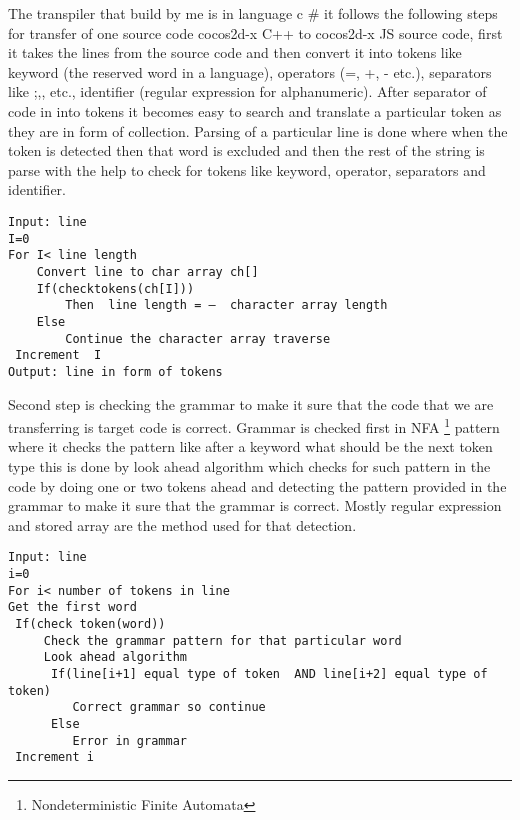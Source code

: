 \documentclass[23pt]{article}
\begin{document}
{\Large The transpiler that build by me is in language c \# it follows the following steps for transfer of one source code cocos2d-x C++ to cocos2d-x JS source code, first it takes the lines from the source code and then convert it into tokens like keyword (the reserved word in a language), operators (=, +, - etc.), separators like {;,},{ etc.}, identifier (regular expression for alphanumeric). After separator of code in into tokens it becomes easy to search and translate a particular token as they are in form of collection. Parsing of a particular line is done where when the token is detected then that word is excluded and then the rest of the string is parse with the help to check for tokens like keyword, operator, separators and identifier. \\ \par}

\begin{lstlisting}[label=some-code,caption= Algorithm Lexical analysis]
 Input: line 
I=0
For I< line length
    Convert line to char array ch[]
    If(checktokens(ch[I]))
        Then  line length = –  character array length
    Else 
        Continue the character array traverse
 Increment  I
Output: line in form of tokens

\end{lstlisting}

{\Large Second step is checking the grammar to make it sure that the code that we are transferring is target code is correct. Grammar is checked first in NFA \footnote{Nondeterministic Finite Automata }   pattern where it checks the pattern like after a keyword what should be the next token type this is done by look ahead algorithm which checks for such pattern in the code by doing one or two tokens ahead and detecting the pattern provided in the grammar to make it sure that the grammar is correct. Mostly regular expression and stored array are the method used for that detection. \\ \par}

\begin{lstlisting}[label=some-code,caption= Algorithm for grammar check]
Input: line
i=0
For i< number of tokens in line
Get the first word
 If(check token(word))
     Check the grammar pattern for that particular word
     Look ahead algorithm
      If(line[i+1] equal type of token  AND line[i+2] equal type of token)
         Correct grammar so continue
      Else
         Error in grammar
 Increment i

\end{lstlisting}
\end{document}
